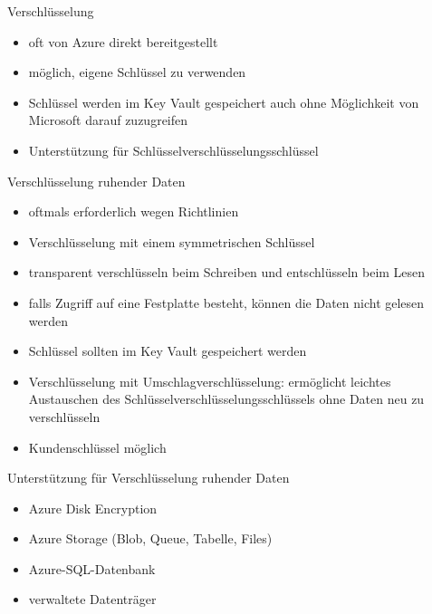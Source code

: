 
\begin{flashcard}[Definition]{Verschlüsselung}
  \begin{itemize}
    \item oft von Azure direkt bereitgestellt
    \item möglich, eigene Schlüssel zu verwenden
    \item Schlüssel werden im Key Vault gespeichert\newline
      auch ohne Möglichkeit von Microsoft darauf zuzugreifen
    \item Unterstützung für Schlüsselverschlüsselungsschlüssel
  \end{itemize}
\end{flashcard}

\begin{flashcard}[Definition]{Verschlüsselung ruhender Daten}
  \begin{itemize}
    \item oftmals erforderlich wegen Richtlinien
    \item Verschlüsselung mit einem symmetrischen Schlüssel
    \item transparent verschlüsseln beim Schreiben und entschlüsseln beim Lesen
    \item falls Zugriff auf eine Festplatte besteht, können die Daten nicht gelesen werden
    \item Schlüssel sollten im Key Vault gespeichert werden
    \item Verschlüsselung mit Umschlagverschlüsselung:\newline
      ermöglicht leichtes Austauschen des Schlüsselverschlüsselungsschlüssels ohne Daten neu zu verschlüsseln
    \item Kundenschlüssel möglich
  \end{itemize}
\end{flashcard}

\begin{flashcard}[Definition]{Unterstützung für Verschlüsselung ruhender Daten}
  \begin{itemize}
    \item Azure Disk Encryption
    \item Azure Storage (Blob, Queue, Tabelle, Files)
    \item Azure-SQL-Datenbank
    \item verwaltete Datenträger
  \end{itemize}
\end{flashcard}

